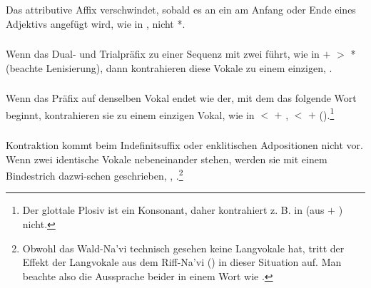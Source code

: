 \subsubsection{} Das attributive Affix  verschwindet, sobald es an ein  am Anfang oder Ende eines Adjektivs angefügt wird, wie in , nicht *.

\subsubsection{} Wenn das Dual- und Trialpräfix zu einer Sequenz mit zwei  führt, wie in  $+$  $>$ * (beachte Lenisierung), dann kontrahieren diese Vokale zu einem einzigen, .
\label{lands:phonotactics:nsc} 

\subsubsection{} Wenn das Präfix auf denselben Vokal endet wie der, mit dem das folgende Wort beginnt, kontrahieren sie zu einem einzigen Vokal, wie in  $<$  $+$ ,  $<$  $+$  ().\footnote{Der glottale Plosiv ist ein Konsonant, daher kontrahiert z. B.  in  (aus  $+$ ) nicht.}
\label{lands:phonotactics:precontract}

\subsubsection{} Kontraktion kommt beim Indefinitsuffix  oder enklitischen Adpositionen nicht vor. Wenn zwei identische Vokale nebeneinander stehen, werden sie mit einem Bindestrich dazwi-schen geschrieben,  ,  .\footnote{Obwohl das Wald-Na'vi technisch gesehen keine Langvokale hat, tritt der Effekt der Langvokale aus dem Riff-Na'vi () in dieser Situation auf. Man beachte also die Aussprache beider  in einem Wort wie .}

